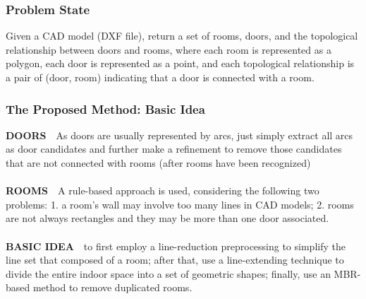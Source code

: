 
\begin{frame}
\frametitle{Problem State}

\begin{problem}
  Given a CAD model (DXF file), return a set of rooms, doors, and the topological relationship between doors and rooms, where each room is represented as a polygon, each door is represented as a point, and each topological relationship is a pair of (door, room) indicating that a door is connected with a room.
\end{problem}

\end{frame}


\begin{frame}
\frametitle{The Proposed Method: Basic Idea}

\textbf{DOORS}~~As doors are usually represented by arcs, just simply extract all arcs as door candidates and further make a refinement to remove those candidates that are not connected with rooms (after rooms have been recognized)\\~\\

\textbf{ROOMS}~~A rule-based approach is used, considering the following two problems: 1. a room's wall may involve too many lines in CAD models; 2. rooms are not always rectangles and they may be more than one door associated.\\~\\

\textbf{BASIC IDEA}~~to first employ a line-reduction preprocessing to simplify the line set that composed of a room; after that, use a line-extending technique to divide the entire indoor space into a set of geometric shapes; finally, use an MBR-based method to remove duplicated rooms.

\end{frame}


